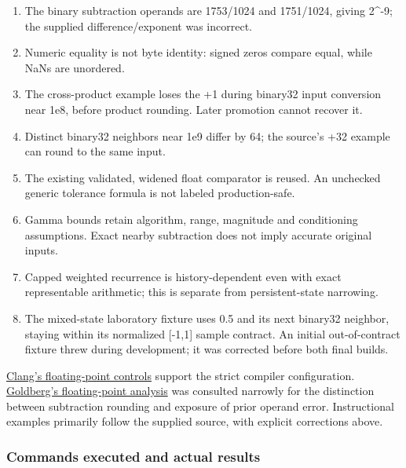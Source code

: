 \begin{enumerate}
\def\labelenumi{\arabic{enumi}.}
\tightlist
\item
  The binary subtraction operands are 1753/1024 and 1751/1024, giving 2\^{}-9; the supplied difference/exponent was incorrect.
\item
  Numeric equality is not byte identity: signed zeros compare equal, while NaNs are unordered.
\item
  The cross-product example loses the +1 during binary32 input conversion near 1e8, before product rounding. Later promotion cannot recover it.
\item
  Distinct binary32 neighbors near 1e9 differ by 64; the source's +32 example can round to the same input.
\item
  The existing validated, widened float comparator is reused. An unchecked generic tolerance formula is not labeled production-safe.
\item
  Gamma bounds retain algorithm, range, magnitude and conditioning assumptions. Exact nearby subtraction does not imply accurate original inputs.
\item
  Capped weighted recurrence is history-dependent even with exact representable arithmetic; this is separate from persistent-state narrowing.
\item
  The mixed-state laboratory fixture uses 0.5 and its next binary32 neighbor, staying within its normalized {[}-1,1{]} sample contract. An initial out-of-contract fixture threw during development; it was corrected before both final builds.
\end{enumerate}

\href{https://clang.llvm.org/docs/UsersManual.html\#controlling-floating-point-behavior}{Clang's floating-point controls} support the strict compiler configuration. \href{https://docs.oracle.com/cd/E19957-01/806-3568/ncg_goldberg.html}{Goldberg's floating-point analysis} was consulted narrowly for the distinction between subtraction rounding and exposure of prior operand error. Instructional examples primarily follow the supplied source, with explicit corrections above.

\subsubsection{Commands executed and actual results}\label{appendix-a103e7846d21-commands-executed-and-actual-results}

\hypertarget{appendix-a103e7846d21-commands-executed-and-actual-results}{}

